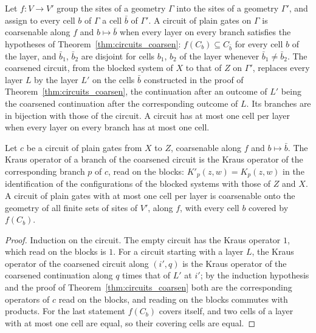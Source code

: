 \begin{definition}
    \label{def:circuits_coarsen_circuit}
    \leanok
    Let $f:V\to V'$ group the sites of a geometry $\Gamma$ into the sites of a geometry
    $\Gamma'$, and assign to every cell $b$ of $\Gamma$ a cell $\bar b$ of $\Gamma'$. A
    circuit of plain gates on $\Gamma$ is coarsenable along $f$ and $b\mapsto\bar b$ when
    every layer on every branch satisfies the hypotheses of
    Theorem~\ref{thm:circuits_coarsen}: $f(C_b)\subseteq C_{\bar b}$ for every cell $b$
    of the layer, and $\bar b_1$, $\bar b_2$ are disjoint for cells $b_1$, $b_2$ of the
    layer whenever $\bar b_1\neq\bar b_2$. The coarsened circuit, from the blocked system
    of $X$ to that of $Z$ on $\Gamma'$, replaces every layer $L$ by the layer $L'$ on the
    cells $\bar b$ constructed in the proof of Theorem~\ref{thm:circuits_coarsen}, the
    continuation after an outcome of $L'$ being the coarsened continuation after the
    corresponding outcome of $L$. Its branches are in bijection with those of the circuit.
    A circuit has at most one cell per layer when every layer on every branch has at most
    one cell.
\end{definition}

\begin{theorem}
    \label{thm:circuits_coarsen_circuit}
    \leanok
    Let $c$ be a circuit of plain gates from $X$ to $Z$, coarsenable along $f$ and
    $b\mapsto\bar b$. The Kraus operator of a branch of the coarsened circuit is the Kraus
    operator of the corresponding branch $p$ of $c$, read on the blocks:
    $K'_{p}(z,w)=K_p(z,w)$ in the identification of the configurations of the blocked
    systems with those of $Z$ and $X$. A circuit of plain gates with at most one cell per
    layer is coarsenable onto the geometry of all finite sets of sites of $V'$, along $f$,
    with every cell $b$ covered by $f(C_b)$.
\end{theorem}
\begin{proof}\leanok
    Induction on the circuit. The empty circuit has the Kraus operator $1$, which read on
    the blocks is $1$. For a circuit starting with a layer $L$, the Kraus operator of the
    coarsened circuit along $(i',q)$ is the Kraus operator of the coarsened continuation
    along $q$ times that of $L'$ at $i'$; by the induction hypothesis and the proof of
    Theorem~\ref{thm:circuits_coarsen} both are the corresponding operators of $c$ read on
    the blocks, and reading on the blocks commutes with products. For the last statement
    $f(C_b)$ covers itself, and two cells of a layer with at most one cell are equal, so
    their covering cells are equal.
\end{proof}

